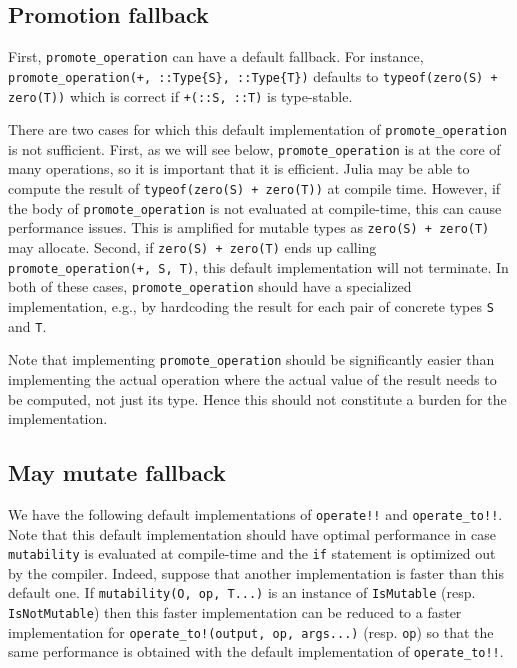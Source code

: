 \documentclass{juliacon}
\begin{document}
\subsection{Promotion fallback}
First, \lstinline|promote_operation| can have a default fallback.
For instance, \lstinline|promote_operation(+, ::Type{S}, ::Type{T})|
defaults to \lstinline|typeof(zero(S) + zero(T))| which is correct if \lstinline|+(::S, ::T)| is type-stable.

There are two cases for which this default implementation of \lstinline|promote_operation| is not sufficient.
First, as we will see below, \lstinline|promote_operation| is at the core of many operations, so it is important that it is efficient.
Julia may be able to compute the result of \lstinline|typeof(zero(S) + zero(T))| at compile time.
However, if the body of \lstinline|promote_operation| is not evaluated at compile-time, this can cause performance issues.
This is amplified for mutable types as \lstinline|zero(S) + zero(T)| may allocate.
Second, if \lstinline|zero(S) + zero(T)| ends up calling \lstinline|promote_operation(+, S, T)|, this default implementation will not terminate.
In both of these cases, \lstinline|promote_operation| should have a specialized implementation, e.g., by hardcoding the result for each pair of concrete types \lstinline|S| and \lstinline|T|.

Note that implementing \lstinline|promote_operation| should be significantly easier than implementing the actual operation where the actual value of the result needs to be computed, not just its type.
Hence this should not constitute a burden for the implementation.

\subsection{May mutate fallback}
We have the following default implementations of \lstinline|operate!!| and \lstinline|operate_to!!|.
Note that this default implementation should have optimal performance in case \lstinline|mutability| is evaluated at compile-time and the \lstinline|if| statement is optimized out by the compiler.
Indeed, suppose that
another implementation is faster than this default one.
If \lstinline|mutability(O, op, T...)| is an instance of \lstinline|IsMutable| (resp. \lstinline|IsNotMutable|)
then this faster implementation can be reduced to a faster implementation for \lstinline|operate_to!(output, op, args...)| (resp. \lstinline|op|)
so that the same performance is obtained with the default implementation of \lstinline|operate_to!!|.
\end{document}
